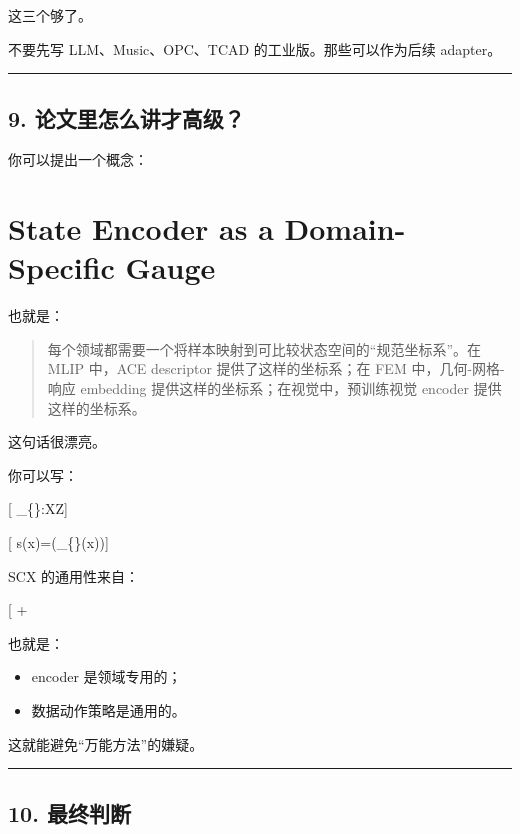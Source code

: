 \documentclass[
  12pt,
]{ctexart}
\providecommand{\tightlist}{%
  \setlength{\itemsep}{0pt}\setlength{\parskip}{0pt}}
\begin{document}
这三个够了。

不要先写 LLM、Music、OPC、TCAD 的工业版。那些可以作为后续 adapter。

\begin{center}\rule{0.5\linewidth}{0.5pt}\end{center}

\subsection{9.
论文里怎么讲才高级？}\label{ux8bbaux6587ux91ccux600eux4e48ux8bb2ux624dux9ad8ux7ea7}

你可以提出一个概念：

\section{\texorpdfstring{\textbf{State Encoder as a Domain-Specific
Gauge}}{State Encoder as a Domain-Specific Gauge}}\label{state-encoder-as-a-domain-specific-gauge}

也就是：

\begin{quote}
每个领域都需要一个将样本映射到可比较状态空间的``规范坐标系''。在 MLIP
中，ACE descriptor 提供了这样的坐标系；在 FEM 中，几何-网格-响应
embedding 提供这样的坐标系；在视觉中，预训练视觉 encoder
提供这样的坐标系。
\end{quote}

这句话很漂亮。

你可以写：

{[} \phi\_\{\}:\mathcal X\rightarrow\mathcal Z{]}

{[} s(x)=\Pi(\phi\_\{\}(x)){]}

SCX 的通用性来自：

{[}  +
\text{domain-invariant decision policy}{]}

也就是：

\begin{itemize}
\tightlist
\item
  encoder 是领域专用的；
\item
  数据动作策略是通用的。
\end{itemize}

这就能避免``万能方法''的嫌疑。

\begin{center}\rule{0.5\linewidth}{0.5pt}\end{center}

\subsection{10. 最终判断}\label{ux6700ux7ec8ux5224ux65ad-15}
\end{document}
